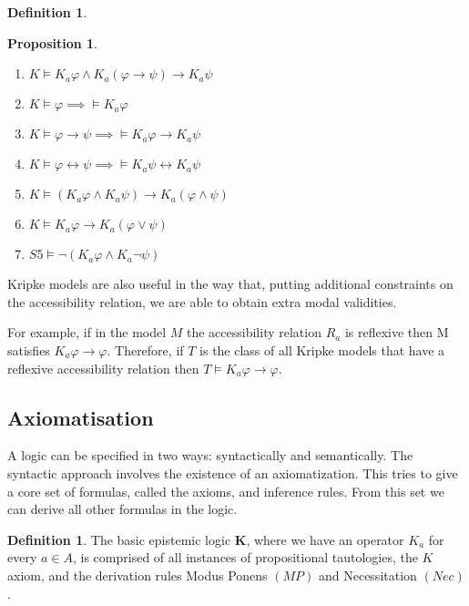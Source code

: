\documentclass[12pt]{article}
\numberwithin{equation}{section}
\theoremstyle{definition}
\newtheorem{prop}[thm]{Proposition}
\theoremstyle{definition}
\newtheorem{defn}[thm]{Definition}
\theoremstyle{remark}
\begin{document}
\begin{defn}
\begin{prop}
\begin{enumerate}

\item $K\models K_a \varphi\land K_a(\varphi \rightarrow \psi) \rightarrow K_a\psi$
\item $K\models \varphi \implies \models K_a\varphi$
\item $K\models \varphi \rightarrow \psi \implies\models K_a\varphi \rightarrow K_a\psi$
\item $K\models \varphi \leftrightarrow \psi \implies \models K_a\psi \leftrightarrow K_a\psi$
\item $K\models (K_a\varphi\land K_a\psi) \rightarrow K_a(\varphi\land\psi)$
\item $K\models K_a\varphi \rightarrow K_a(\varphi\lor\psi)$
\item $S5 \models \neg(K_a\varphi\land K_a\neg\psi)$

\end{enumerate}
\end{prop}

Kripke models are also useful in the way that, putting additional constraints on the accessibility relation, we are able to obtain extra modal validities.

For example, if in the model $M$ the accessibility relation $R_a$ is reflexive then M satisfies $K_a \varphi \rightarrow \varphi$.
Therefore, if $T$ is the class of all Kripke models that have a reflexive accessibility relation then $T \models K_a \varphi \rightarrow \varphi$.
\end{defn}

\subsection{Axiomatisation}

A logic can be specified in two ways: syntactically and semantically. The syntactic approach involves the existence of an axiomatization.
This tries to give a core set of formulas, called the axioms, and inference rules. From this set we can derive all other formulas in the logic.

\begin{defn}

The basic epistemic logic \textbf{K}, where we have an operator $K_a$ for every $a \in A$, is comprised of all instances of propositional tautologies, the
$K$ axiom, and the derivation rules Modus Ponens $(MP)$ and Necessitation
$(Nec)$.

\end{defn}
\end{document}
